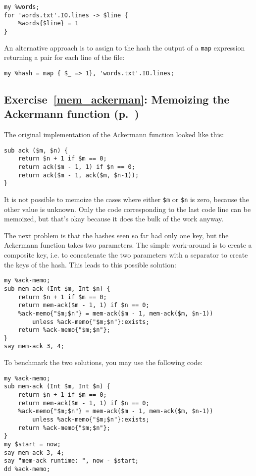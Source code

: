 {\begin{verbatim}
my %words;
for 'words.txt'.IO.lines -> $line {
    %words{$line} = 1
}
\end{verbatim}

An alternative approach is to assign to the hash the 
output of a {\tt map} expression returning a pair for each 
line of the file:

\begin{verbatim}
my %hash = map { $_ => 1}, 'words.txt'.IO.lines;
\end{verbatim}
%

\subsection{Exercise~\ref{mem_ackerman}: Memoizing the Ackermann function (p.~\pageref{mem_ackerman})}
\label{sol_mem_ackerman}

The original implementation of the Ackermann function looked 
like this:

\begin{verbatim}
sub ack ($m, $n) {
    return $n + 1 if $m == 0;
    return ack($m - 1, 1) if $n == 0;
    return ack($m - 1, ack($m, $n-1));
}
\end{verbatim}

It is not possible to memoize the cases where either \verb'$m' 
or \verb'$n' is zero, because the other value is unknown. Only 
the code corresponding to the last code line can be memoized, 
but that's okay because it does the bulk of the work anyway.

The next problem is that the hashes seen so far had only one 
key, but the Ackermann function takes two parameters. The 
simple work-around is to create a composite key, i.e. to 
concatenate the two parameters with a separator to create 
the keys of the hash. This leads to this possible solution:

\begin{verbatim}
my %ack-memo;
sub mem-ack (Int $m, Int $n) {
    return $n + 1 if $m == 0;
    return mem-ack($m - 1, 1) if $n == 0;
    %ack-memo{"$m;$n"} = mem-ack($m - 1, mem-ack($m, $n-1))
        unless %ack-memo{"$m;$n"}:exists;
    return %ack-memo{"$m;$n"};
}
say mem-ack 3, 4;
\end{verbatim} 

To benchmark the two solutions, you may use the following 
code:

\begin{verbatim}
my %ack-memo;
sub mem-ack (Int $m, Int $n) {
    return $n + 1 if $m == 0;
    return mem-ack($m - 1, 1) if $n == 0;
    %ack-memo{"$m;$n"} = mem-ack($m - 1, mem-ack($m, $n-1)) 
        unless %ack-memo{"$m;$n"}:exists;
    return %ack-memo{"$m;$n"};
}
my $start = now;
say mem-ack 3, 4;
say "mem-ack runtime: ", now - $start;
dd %ack-memo;


\end{verbatim}}
